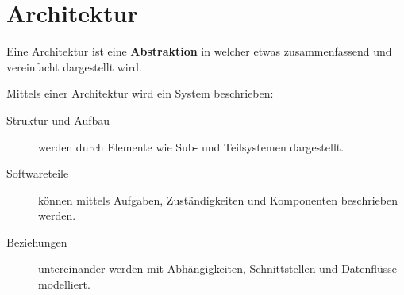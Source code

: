 \section{Architektur}
Eine Architektur ist eine \textbf{Abstraktion} in welcher etwas zusammenfassend und vereinfacht dargestellt wird.

Mittels einer Architektur wird ein System beschrieben:

\begin{description}
	\item[Struktur und Aufbau] werden durch Elemente wie Sub- und Teilsystemen dargestellt.
	\item[Softwareteile] können mittels Aufgaben, Zuständigkeiten und Komponenten beschrieben werden.
	\item [Beziehungen] untereinander werden mit Abhängigkeiten, Schnittstellen und Datenflüsse modelliert.
\end{description}

